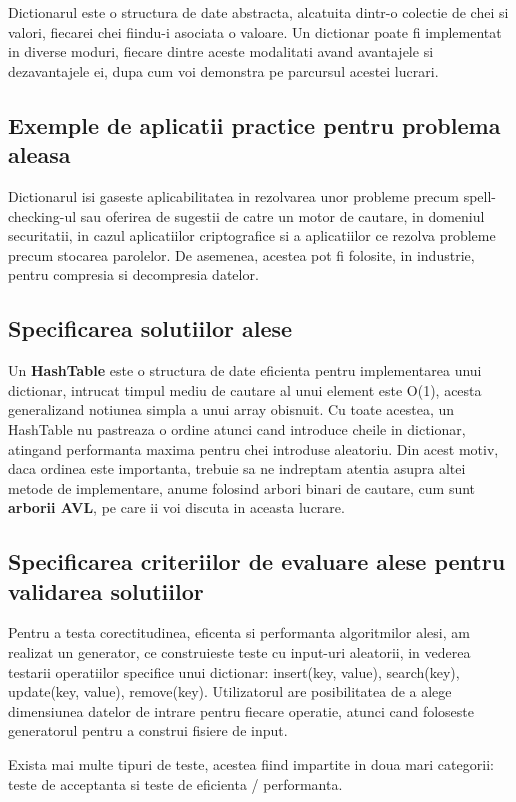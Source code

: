 \documentclass[runningheads]{llncs}
\begin{document}
Dictionarul este o structura de date abstracta, alcatuita dintr-o colectie de chei si valori, fiecarei chei fiindu-i asociata o valoare. Un dictionar poate fi implementat in diverse moduri, fiecare dintre aceste modalitati avand avantajele si dezavantajele ei, dupa cum voi demonstra pe parcursul acestei lucrari. 

\subsection{Exemple de aplicatii practice pentru problema aleasa}
Dictionarul isi gaseste aplicabilitatea in rezolvarea unor probleme precum spell-checking-ul sau oferirea de sugestii de catre un motor de cautare, in domeniul securitatii, in cazul aplicatiilor criptografice si a aplicatiilor ce rezolva probleme precum stocarea parolelor. De asemenea, acestea pot fi folosite, in industrie, pentru compresia si decompresia datelor.

\subsection{Specificarea solutiilor alese}
\quad Un \textbf{HashTable} este o structura de date eficienta pentru implementarea unui dictionar, intrucat timpul mediu de cautare al unui element este O(1), acesta generalizand notiunea simpla a unui array obisnuit. Cu toate acestea, un HashTable nu pastreaza o ordine atunci cand introduce cheile in dictionar, atingand performanta maxima pentru chei introduse aleatoriu. Din acest motiv, daca ordinea este importanta, trebuie sa ne indreptam atentia asupra altei metode de implementare, anume folosind arbori binari de cautare, cum sunt \textbf{arborii AVL}, pe care ii voi discuta in aceasta lucrare.

\subsection{Specificarea criteriilor de evaluare alese pentru validarea solutiilor}
\quad Pentru a testa corectitudinea, eficenta si performanta algoritmilor alesi, am realizat un generator, ce construieste teste cu input-uri aleatorii, in vederea testarii operatiilor specifice unui dictionar: insert(key, value), search(key), update(key, value), remove(key). Utilizatorul are posibilitatea de a alege dimensiunea datelor de intrare pentru fiecare operatie, atunci cand foloseste generatorul pentru a construi fisiere de input. 

Exista mai multe tipuri de teste, acestea fiind impartite in doua mari categorii: teste de acceptanta si teste de eficienta / performanta.
\end{document}
